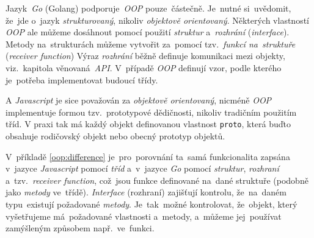 \documentclass[11pt,a4paper]{report}
\begin{document}
            Jazyk~\emph{Go} (Golang) podporuje~\emph{OOP} pouze~částečně. Je~nutné si~uvědomit, že~jde o~jazyk \emph{strukturovaný}, nikoliv \emph{objektově orientovaný}. Některých vlastností \emph{OOP} ale můžeme dosáhnout pomocí použití \emph{struktur} a~\emph{rozhrání} (\emph{interface}). Metody na~strukturách můžeme vytvořit za~pomocí tzv.~\emph{funkcí na~struktuře} (\emph{receiver function})
            Výraz \emph{rozhrání} běžně definuje komunikaci mezi objekty, viz.~kapitola věnovaná~\emph{API}. V~případě \emph{OOP} definují vzor, podle kterého je~potřeba implementovat budoucí třídy. \cite{go:OOP}
            
            A \emph{Javascript} je sice považován za \emph{objektově orientovaný}, nicméně \emph{OOP} implementuje formou tzv.~prototypové dědičnosti, nikoliv tradičním použitím tříd. V praxi tak má každý objekt definovanou vlastnost \texttt{proto}, která buďto obsahuje rodičovský objekt nebo obecný prototyp objektů. \cite[2.1.01]{kantor_javascript}
            
            V~příkladě \ref{oop:difference} je~pro~porovnání ta~samá funkcionalita zapsána v~jazyce \emph{Javascript} pomocí \emph{tříd} a~v~jazyce \emph{Go} pomocí \emph{struktur}, \emph{rozhraní} a~tzv.~\emph{receiver function}, což~jsou funkce definované na~dané struktuře (podobně jako \emph{metody} ve~třídě). \emph{Interface} (rozhraní) zajišťují kontrolu, že~na~daném typu~existují požadované \emph{metody}. Je~tak~možné kontrolovat, že~objekt, který vyšetřujeme má~požadované vlastnosti a~metody, a~můžeme jej~používat zamýšleným způsobem např.~ve~funkci.~\cite{go:OOP}
\end{document}
